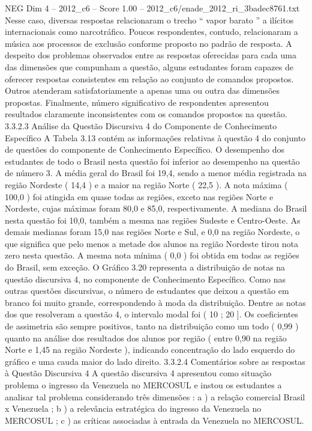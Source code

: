 \begin{textsample}{NEG Dim 4 – 2012\_c6 – Score 1.00 – 2012\_c6/enade\_2012\_ri\_3badec8761.txt}
Nesse caso, diversas respostas relacionaram o trecho “ vapor barato ” a ilícitos internacionais como narcotráfico.
Poucos respondentes, contudo, relacionaram a música aos processos de exclusão conforme proposto no padrão de resposta.
A despeito dos problemas observados entre as respostas oferecidas para cada uma das dimensões que compunham a questão, alguns estudantes foram capazes de oferecer respostas consistentes em relação ao conjunto de comandos propostos.
Outros atenderam satisfatoriamente a apenas uma ou outra das dimensões propostas.
Finalmente, número significativo de respondentes apresentou resultados claramente inconsistentes com os comandos propostos na questão. 3.3.2.3 Análise da Questão Discursiva 4 do Componente de Conhecimento Específico A Tabela 3.13 contém as informações relativas à questão 4 do conjunto de questões do componente de Conhecimento Específico.
O desempenho dos estudantes de todo o Brasil nesta questão foi inferior ao desempenho na questão de número 3.
A média geral do Brasil foi 19,4, sendo a menor média registrada na região Nordeste ( 14,4 ) e a maior na região Norte ( 22,5 ).
A nota máxima ( 100,0 ) foi atingida em quase todas as regiões, exceto nas regiões Norte e Nordeste, cujas máximas foram 80,0 e 85,0, respectivamente.
A mediana do Brasil nesta questão foi 10,0, também a mesma nas regiões Sudeste e Centro-Oeste.
As demais medianas foram 15,0 nas regiões Norte e Sul, e 0,0 na região Nordeste, o que significa que pelo menos a metade dos alunos na região Nordeste tirou nota zero nesta questão.
A mesma nota mínima ( 0,0 ) foi obtida em todas as regiões do Brasil, sem exceção.
O Gráfico 3.20 representa a distribuição de notas na questão discursiva 4, no componente de Conhecimento Específico.
Como nas outras questões discursivas, o número de estudantes que deixou a questão em branco foi muito grande, correspondendo à moda da distribuição.
Dentre as notas dos que resolveram a questão 4, o intervalo modal foi ( 10 ; 20 ].
Os coeficientes de assimetria são sempre positivos, tanto na distribuição como um todo ( 0,99 ) quanto na análise dos resultados dos alunos por região ( entre 0,90 na região Norte e 1,45 na região Nordeste ), indicando concentração do lado esquerdo do gráfico e uma cauda maior do lado direito. 3.3.2.4 Comentários sobre as respostas à Questão Discursiva 4 A questão discursiva 4 apresentou como situação problema o ingresso da Venezuela no MERCOSUL e instou os estudantes a analisar tal problema considerando três dimensões : a ) a relação comercial Brasil x Venezuela ; b ) a relevância estratégica do ingresso da Venezuela no MERCOSUL ; c ) as críticas associadas à entrada da Venezuela no MERCOSUL.

\end{textsample}
